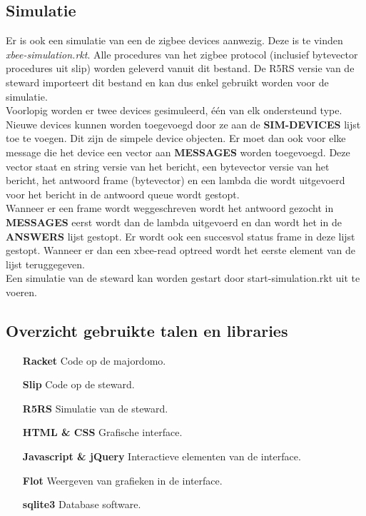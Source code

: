 \documentclass{article}
\begin{document}
\subsection{Simulatie}
\label{sub:simulation}
Er is ook een simulatie van een de zigbee devices aanwezig. Deze is te vinden \emph{xbee-simulation.rkt}. Alle procedures van het zigbee protocol (inclusief bytevector procedures uit slip) worden geleverd vanuit dit bestand. De R5RS versie van de steward importeert dit bestand en kan dus enkel gebruikt worden voor de simulatie.\\
Voorlopig worden er twee devices gesimuleerd, \'e\'en van elk ondersteund type. Nieuwe devices kunnen worden toegevoegd door ze aan de \textbf{SIM-DEVICES} lijst toe te voegen. Dit zijn de simpele device objecten. Er moet dan ook voor elke message die het device een vector aan \textbf{MESSAGES} worden toegevoegd. Deze vector staat en string versie van het bericht, een bytevector versie van het bericht, het antwoord frame (bytevector) en een lambda die wordt uitgevoerd voor het bericht in de antwoord queue wordt gestopt.\\
Wanneer er een frame wordt weggeschreven wordt het antwoord gezocht in \textbf{MESSAGES} eerst wordt dan de lambda uitgevoerd en dan wordt het in de \textbf{ANSWERS} lijst gestopt. Er wordt ook een succesvol status frame in deze lijst gestopt. Wanneer er dan een xbee-read optreed wordt het eerste element van de lijst teruggegeven.\\
Een simulatie van de steward kan worden gestart door start-simulation.rkt uit te voeren.


\subsection{Overzicht gebruikte talen en libraries}
\label{sub:langs}
\begin{itemize}
	\item[\textbf{Racket}] Code op de majordomo.
	\item[\textbf{Slip}] Code op de steward.
	\item[\textbf{R5RS}] Simulatie van de steward.
	\item[\textbf{HTML \& CSS}] Grafische interface.
	\item[\textbf{Javascript \& jQuery}] Interactieve elementen van de interface.
	\item[\textbf{Flot}] Weergeven van grafieken in de interface.
	\item[\textbf{sqlite3}] Database software.
\end{itemize}


\end{document}
